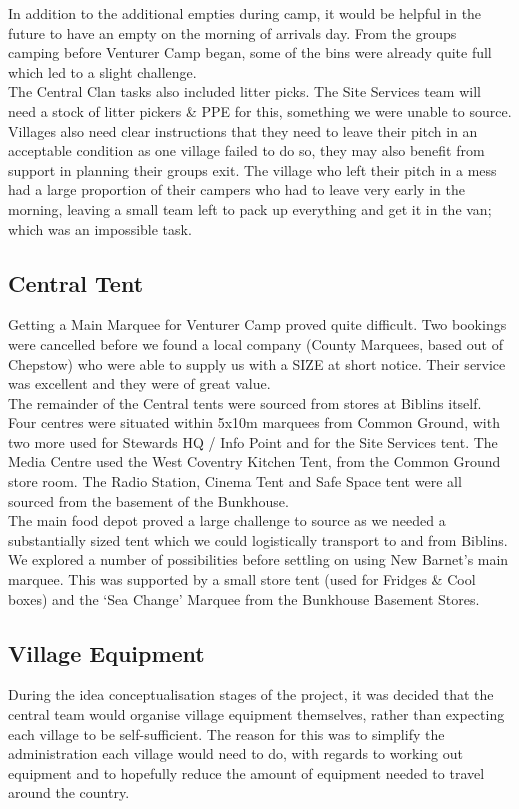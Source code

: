 In addition to the additional empties during camp, it would be helpful in the future to have an empty on the morning of arrivals day. From the groups camping before Venturer Camp began, some of the bins were already quite full which led to a slight challenge.\\

The Central Clan tasks also included litter picks. The Site Services team will need a stock of litter pickers \& PPE for this, something we were unable to source. Villages also need clear instructions that they need to leave their pitch in an acceptable condition as one village failed to do so, they may also benefit from support in planning their groups exit. The village who left their pitch in a mess had a large proportion of their campers who had to leave very early in the morning, leaving a small team left to pack up everything and get it in the van; which was an impossible task. 

\subsection{Central Tent}
Getting a Main Marquee for Venturer Camp proved quite difficult. Two bookings were cancelled before we found a local company (County Marquees, based out of Chepstow) who were able to supply us with a SIZE at short notice. Their service was excellent and they were of great value.\\

The remainder of the Central tents were sourced from stores at Biblins itself. Four centres were situated within 5x10m marquees from Common Ground, with two more used for Stewards HQ / Info Point and for the Site Services tent. The Media Centre used the West Coventry Kitchen Tent, from the Common Ground store room. The Radio Station, Cinema Tent and Safe Space tent were all sourced from the basement of the Bunkhouse.\\

The main food depot proved a large challenge to source as we needed a substantially sized tent which we could logistically transport to and from Biblins. We explored a number of possibilities before settling on using New Barnet's main marquee. This was supported by a small store tent (used for Fridges \& Cool boxes) and the `Sea Change' Marquee from the Bunkhouse Basement Stores. 

\subsection{Village Equipment}
During the idea conceptualisation stages of the project, it was decided that the central team would organise village equipment themselves, rather than expecting each village to be self-sufficient. The reason for this was to simplify the administration each village would need to do, with regards to working out equipment and to hopefully reduce the amount of equipment needed to travel around the country.\\

